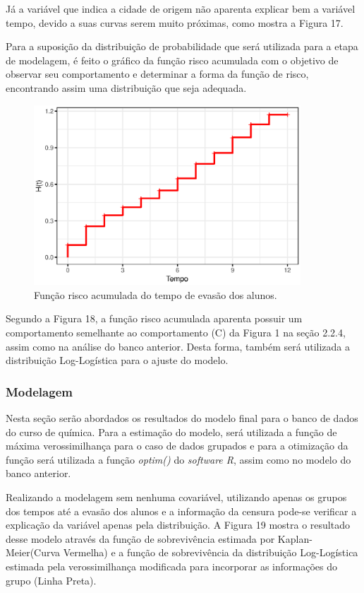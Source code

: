 \documentclass[a4paper,12pt]{article}
\begin{document}
Já a variável que indica a cidade de origem não aparenta explicar bem a variável tempo, devido a suas curvas serem muito próximas, como mostra a Figura 17.

Para a suposição da distribuição de probabilidade que será utilizada para a etapa de modelagem, é feito o gráfico da função risco acumulada com o objetivo de observar seu comportamento e determinar a forma da função de risco, encontrando assim uma distribuição que seja adequada.

\begin{figure}[H]
\centering
\includegraphics[width=10cm]{cum_quim}
\caption{Função risco acumulada do tempo de evasão dos alunos.}
\end{figure}

Segundo a Figura 18, a função risco acumulada aparenta possuir um comportamento semelhante ao comportamento (C) da Figura 1 na seção 2.2.4, assim como na análise do banco anterior. Desta forma, também será utilizada a distribuição Log-Logística para o ajuste do modelo.

\subsubsection{Modelagem}

Nesta seção serão abordados os resultados do modelo final para o banco de dados do curso de química. Para a estimação do modelo, será utilizada a função de máxima verossimilhança para o caso de dados grupados e para a otimização da função será utilizada a função \textit{optim()} do \textit{software R}, assim como no modelo do banco anterior.

Realizando a modelagem sem nenhuma covariável, utilizando apenas os grupos dos tempos até a evasão dos alunos e a informação da censura pode-se verificar a explicação da variável apenas pela distribuição. A Figura 19 mostra o resultado desse modelo através da função de sobrevivência estimada por Kaplan-Meier(Curva Vermelha) e a função de sobrevivência da distribuição Log-Logística estimada pela verossimilhança modificada para incorporar as informações do grupo (Linha Preta).
\end{document}
